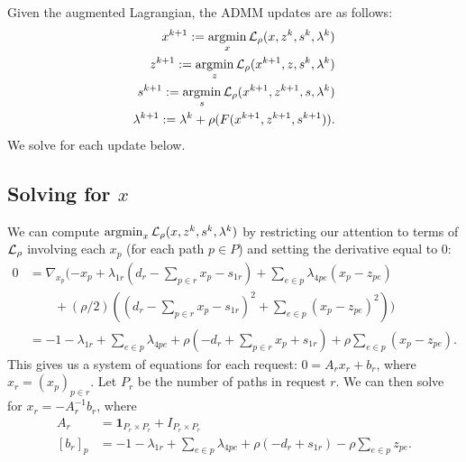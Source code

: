 \documentclass[11pt]{article}
\begin{document}
Given the augmented Lagrangian, the ADMM updates are as follows:
\begin{equation}
    \begin{aligned}
        x^{k+1} := \operatorname*{argmin}_{x} \mathcal{L}_\rho(x,z^k,s^{k},\lambda^k)\\
        z^{k+1} := \operatorname*{argmin}_{z} \mathcal{L}_\rho(x^{k+1},z,s^{k},\lambda^k)\\
        s^{k+1} := \operatorname*{argmin}_{s} \mathcal{L}_\rho(x^{k+1},z^{k+1},s,\lambda^k)\\
        \lambda^{k+1} := \lambda^k + \rho(F(x^{k+1},z^{k+1},s^{k+1})).
    \end{aligned}
\end{equation}
We solve for each update below.

\subsection{Solving for $x$}
We can compute $\operatorname*{argmin}_{x} \mathcal{L}_\rho(x,z^k,s^k,\lambda^k)$ by restricting our
attention to terms of $\mathcal{L}_\rho$ involving each $x_p$ (for each path $p\in P$)
and setting the derivative equal to 0:
\begin{align*}
0
&= \nabla_{x_p}(-x_p + \lambda_{1r}(d_r - \sum_{p\in r}x_p - s_{1r})
    + \sum_{e\in p}\lambda_{4pe}(x_p - z_{pe})\\
    & \qquad + (\rho/2)((d_r - \sum_{p\in r}x_p - s_{1r})^2 + \sum_{e \in p}(x_p - z_{pe})^2))\\
&= -1 -\lambda_{1r} + \sum_{e \in p}\lambda_{4pe} + \rho(-d_r + \sum_{p\in r}x_p + s_{1r})
    +\rho\sum_{e \in p} (x_p - z_{pe}).
\end{align*}
This gives us a system of equations for each request: $0 = A_rx_r + b_r$,
where $x_r = (x_p)_{p\in r}$.
Let $P_r$ be the number of paths in request $r$.
We can then solve for $x_r = -A_r^{-1}b_r$,
where
\begin{align*}
A_r &= \mathbf{1}_{P_r\times P_r} + I_{P_r\times P_r}\\
[b_r]_p &=
    -1 -\lambda_{1r} + \sum_{e \in p}\lambda_{4pe} + \rho(-d_r + s_{1r})
    - \rho\sum_{e \in p} z_{pe}.
\end{align*}
\end{document}
